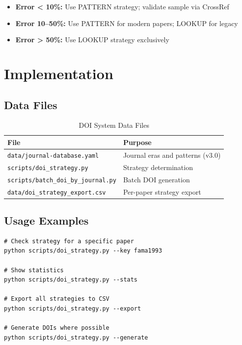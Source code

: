 \begin{tcolorbox}[colback=green!5, colframe=green!50, title=Practical Interpretation]
\begin{itemize}
    \item \textbf{Error < 10\%:} Use PATTERN strategy; validate sample via CrossRef
    \item \textbf{Error 10--50\%:} Use PATTERN for modern papers; LOOKUP for legacy
    \item \textbf{Error > 50\%:} Use LOOKUP strategy exclusively
\end{itemize}
\end{tcolorbox}

\section{Implementation}
\label{sec:implementation}

\subsection{Data Files}

\begin{table}[h]
\centering
\caption{DOI System Data Files}
\begin{tabular}{ll}
\toprule
\textbf{File} & \textbf{Purpose} \\
\midrule
\texttt{data/journal-database.yaml} & Journal eras and patterns (v3.0) \\
\texttt{scripts/doi\_strategy.py} & Strategy determination \\
\texttt{scripts/batch\_doi\_by\_journal.py} & Batch DOI generation \\
\texttt{data/doi\_strategy\_export.csv} & Per-paper strategy export \\
\bottomrule
\end{tabular}
\end{table}

\subsection{Usage Examples}

\begin{verbatim}
# Check strategy for a specific paper
python scripts/doi_strategy.py --key fama1993

# Show statistics
python scripts/doi_strategy.py --stats

# Export all strategies to CSV
python scripts/doi_strategy.py --export

# Generate DOIs where possible
python scripts/doi_strategy.py --generate
\end{verbatim}

